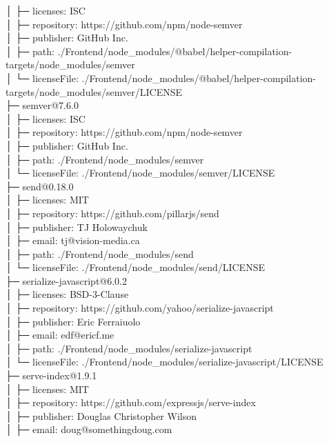 \documentclass[
    paper=a4,
    twoside=false,
    parskip=half,
    listof=entryprefix,
    listof=totoc,
    index=totoc,
    bibliography=totoc,
    headsepline,
]{scrbook}
\begin{document}
    │  ├─ licenses: ISC\\
    │  ├─ repository: https://github.com/npm/node-semver\\
    │  ├─ publisher: GitHub Inc.\\
    │  ├─ path: ./Frontend/node\_modules/@babel/helper-compilation-targets/node\_modules/semver\\
    │  └─ licenseFile: ./Frontend/node\_modules/@babel/helper-compilation-targets/node\_modules/semver/LICENSE\\
    ├─ semver@7.6.0\\
    │  ├─ licenses: ISC\\
    │  ├─ repository: https://github.com/npm/node-semver\\
    │  ├─ publisher: GitHub Inc.\\
    │  ├─ path: ./Frontend/node\_modules/semver\\
    │  └─ licenseFile: ./Frontend/node\_modules/semver/LICENSE\\
    ├─ send@0.18.0\\
    │  ├─ licenses: MIT\\
    │  ├─ repository: https://github.com/pillarjs/send\\
    │  ├─ publisher: TJ Holowaychuk\\
    │  ├─ email: tj@vision-media.ca\\
    │  ├─ path: ./Frontend/node\_modules/send\\
    │  └─ licenseFile: ./Frontend/node\_modules/send/LICENSE\\
    ├─ serialize-javascript@6.0.2\\
    │  ├─ licenses: BSD-3-Clause\\
    │  ├─ repository: https://github.com/yahoo/serialize-javascript\\
    │  ├─ publisher: Eric Ferraiuolo\\
    │  ├─ email: edf@ericf.me\\
    │  ├─ path: ./Frontend/node\_modules/serialize-javascript\\
    │  └─ licenseFile: ./Frontend/node\_modules/serialize-javascript/LICENSE\\
    ├─ serve-index@1.9.1\\
    │  ├─ licenses: MIT\\
    │  ├─ repository: https://github.com/expressjs/serve-index\\
    │  ├─ publisher: Douglas Christopher Wilson\\
    │  ├─ email: doug@somethingdoug.com\\
\end{document}
